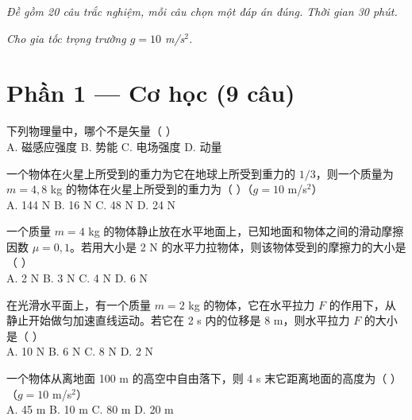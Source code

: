 \documentclass[11pt, a4paper]{article}
\begin{document}

\vspace{0.2cm}
\noindent\emph{Đề gồm 20 câu trắc nghiệm, mỗi câu chọn một đáp án đúng. Thời gian 30 phút.}

\vspace{0.1cm}
\noindent\emph{Cho gia tốc trọng trường $g = 10$ m/s$^2$.}

\section*{Phần 1 — Cơ học (9 câu)}

\begin{baitap}[1]
下列物理量中，哪个不是矢量（ ）\\[4pt]
A. 磁感应强度 \quad B. 势能 \quad C. 电场强度 \quad D. 动量
\end{baitap}

\begin{baitap}[2]
一个物体在火星上所受到的重力为它在地球上所受到重力的 $1/3$，则一个质量为 $m=4{,}8$ kg 的物体在火星上所受到的重力为（ ）（$g=10$ m/s$^2$）\\[4pt]
A. 144 N \quad B. 16 N \quad C. 48 N \quad D. 24 N
\end{baitap}

\begin{baitap}[3]
一个质量 $m=4$ kg 的物体静止放在水平地面上，已知地面和物体之间的滑动摩擦因数 $\mu=0{,}1$。若用大小是 2 N 的水平力拉物体，则该物体受到的摩擦力的大小是（ ）\\[4pt]
A. 2 N \quad B. 3 N \quad C. 4 N \quad D. 6 N
\end{baitap}

\begin{baitap}[4]
在光滑水平面上，有一个质量 $m=2$ kg 的物体，它在水平拉力 $F$ 的作用下，从静止开始做匀加速直线运动。若它在 2 s 内的位移是 8 m，则水平拉力 $F$ 的大小是（ ）\\[4pt]
A. 10 N \quad B. 6 N \quad C. 8 N \quad D. 2 N
\end{baitap}

\begin{baitap}[5]
一个物体从离地面 100 m 的高空中自由落下，则 4 s 末它距离地面的高度为（ ）（$g=10$ m/s$^2$）\\[4pt]
A. 45 m \quad B. 10 m \quad C. 80 m \quad D. 20 m
\end{baitap}
\end{document}
